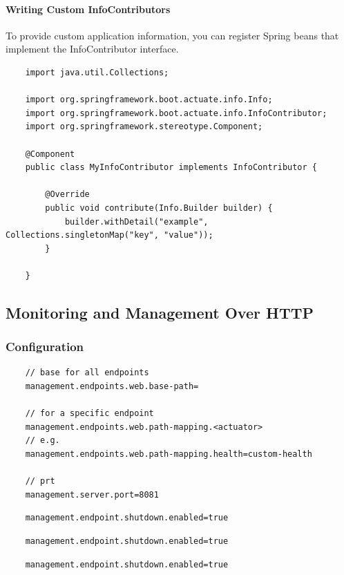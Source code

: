 \documentclass{scrartcl}
\begin{document}
\paragraph{Writing Custom InfoContributors}

    To provide custom application information, you can register Spring beans that implement the InfoContributor interface.

\begin{lstlisting}
    import java.util.Collections;

    import org.springframework.boot.actuate.info.Info;
    import org.springframework.boot.actuate.info.InfoContributor;
    import org.springframework.stereotype.Component;

    @Component
    public class MyInfoContributor implements InfoContributor {

        @Override
        public void contribute(Info.Builder builder) {
            builder.withDetail("example", Collections.singletonMap("key", "value"));
        }

    }
\end{lstlisting}



\subsection{Monitoring and Management Over HTTP}

\subsubsection{Configuration}

\begin{lstlisting}
    // base for all endpoints
    management.endpoints.web.base-path=

    // for a specific endpoint
    management.endpoints.web.path-mapping.<actuator>
    // e.g.
    management.endpoints.web.path-mapping.health=custom-health

    // prt
    management.server.port=8081
\end{lstlisting}

\begin{lstlisting}
    management.endpoint.shutdown.enabled=true
\end{lstlisting}
\begin{lstlisting}
    management.endpoint.shutdown.enabled=true
\end{lstlisting}
\begin{lstlisting}
    management.endpoint.shutdown.enabled=true
\end{lstlisting}
\end{document}
